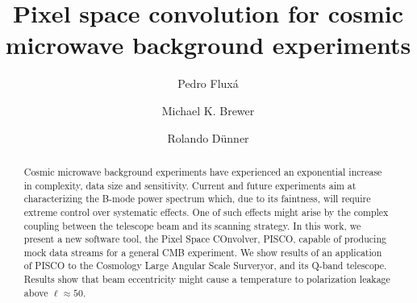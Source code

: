 \documentclass[a4paper,fleqn]{cas-dc}\sloppy
\begin{document}
	
	\let\WriteBookmarks\relax
	\def\floatpagepagefraction{1}
	\def\textpagefraction{.001}
	
	\title [mode = title]{Pixel space convolution for cosmic microwave background experiments}                      
	\tnotemark[1]
	
	\author[1]{Pedro Flux\'a}
	{
		\fnmark[1]
		\address[1]{Vicun\~na Mackenna 4860, Macul, RM, Santiago, Chile}
	}
	
	\author[2]{Michael K. Brewer}
	{
		\fnmark[2]
	}	
	
	\author[3]{Rolando D\"unner}
	{
		\fnmark[3]
		\address[3]{Vicun\~na Mackenna 4860, Macul, RM, Santiago, Chile}
	}
	
	
	
	
	\begin{abstract}
		Cosmic microwave background experiments have experienced an exponential increase in complexity, data size and sensitivity. Current and future experiments aim at characterizing the B-mode power spectrum which, due to its faintness, will require extreme control over systematic effects. One of such effects might arise by the complex coupling between the telescope beam and its scanning strategy. In this work, we present a new software tool, the Pixel Space COnvolver, PISCO, capable of producing mock data streams for a general CMB experiment. We show results of an application of PISCO to the Cosmology Large Angular Scale Surveryor, and its Q-band telescope. Results show that beam eccentricity might cause a temperature to polarization leakage above $\ell \approx 50$. 
	\end{abstract}
	
	\maketitle
	
	
\end{document}
